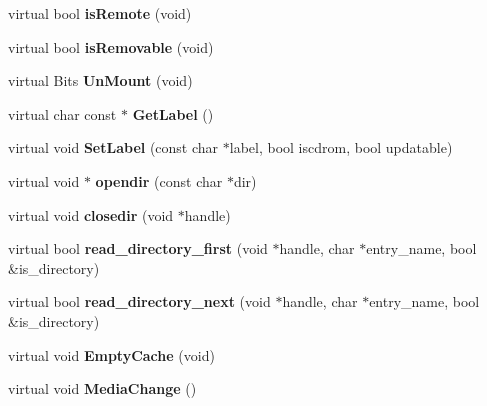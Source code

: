 \begin{DoxyCompactItemize}
\item 
\hypertarget{classlocalDrive_aaa7ae4a2b1c824634b8fb4dc4beea186}{virtual bool {\bfseries is\-Remote} (void)}\label{classlocalDrive_aaa7ae4a2b1c824634b8fb4dc4beea186}

\item 
\hypertarget{classlocalDrive_acf4bb430328064549e1ae307c7d9da5f}{virtual bool {\bfseries is\-Removable} (void)}\label{classlocalDrive_acf4bb430328064549e1ae307c7d9da5f}

\item 
\hypertarget{classlocalDrive_a78fa4db10eac30c4bbb012a91bae2358}{virtual Bits {\bfseries Un\-Mount} (void)}\label{classlocalDrive_a78fa4db10eac30c4bbb012a91bae2358}

\item 
\hypertarget{classlocalDrive_a77e69f2aabe420f7d47afbd6d882727d}{virtual char const $\ast$ {\bfseries Get\-Label} ()}\label{classlocalDrive_a77e69f2aabe420f7d47afbd6d882727d}

\item 
\hypertarget{classlocalDrive_a1a133bdf134c07e73ae69798a6dc286a}{virtual void {\bfseries Set\-Label} (const char $\ast$label, bool iscdrom, bool updatable)}\label{classlocalDrive_a1a133bdf134c07e73ae69798a6dc286a}

\item 
\hypertarget{classlocalDrive_a6ad02364f6c2be9452538e8882136f1b}{virtual void $\ast$ {\bfseries opendir} (const char $\ast$dir)}\label{classlocalDrive_a6ad02364f6c2be9452538e8882136f1b}

\item 
\hypertarget{classlocalDrive_a62a8cc9aaae8084654a192f597673938}{virtual void {\bfseries closedir} (void $\ast$handle)}\label{classlocalDrive_a62a8cc9aaae8084654a192f597673938}

\item 
\hypertarget{classlocalDrive_a0d7c55c38d73ae6720bef188036aae2c}{virtual bool {\bfseries read\-\_\-directory\-\_\-first} (void $\ast$handle, char $\ast$entry\-\_\-name, bool \&is\-\_\-directory)}\label{classlocalDrive_a0d7c55c38d73ae6720bef188036aae2c}

\item 
\hypertarget{classlocalDrive_a4346b5c16c777289484f5617d43a3083}{virtual bool {\bfseries read\-\_\-directory\-\_\-next} (void $\ast$handle, char $\ast$entry\-\_\-name, bool \&is\-\_\-directory)}\label{classlocalDrive_a4346b5c16c777289484f5617d43a3083}

\item 
\hypertarget{classlocalDrive_a9fff98a140e946d23d9f8b2bbedb2649}{virtual void {\bfseries Empty\-Cache} (void)}\label{classlocalDrive_a9fff98a140e946d23d9f8b2bbedb2649}

\item 
\hypertarget{classlocalDrive_afaa833624d219a745861ab746e9cea77}{virtual void {\bfseries Media\-Change} ()}\label{classlocalDrive_afaa833624d219a745861ab746e9cea77}

\end{DoxyCompactItemize}
